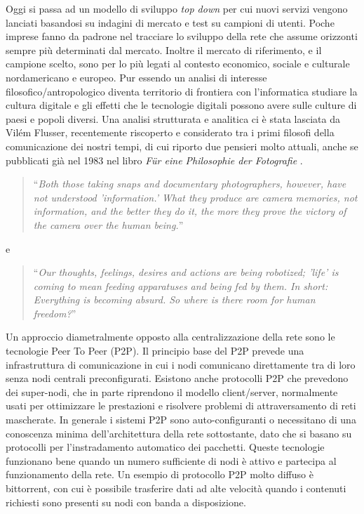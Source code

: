 Oggi si passa ad un modello di sviluppo \emph{top down} per cui nuovi
servizi vengono lanciati basandosi su indagini di mercato e test su
campioni di utenti. Poche imprese fanno da padrone nel tracciare lo
sviluppo della rete che assume orizzonti sempre più determinati dal
mercato. Inoltre il mercato di riferimento, e il campione scelto, sono
per lo più legati al contesto economico, sociale e culturale
nordamericano e europeo. Pur essendo un analisi di interesse
filosofico/antropologico diventa territorio di frontiera con
l'informatica studiare la cultura digitale e gli effetti che le
tecnologie digitali possono avere sulle culture di paesi e popoli
diversi. Una analisi strutturata e analitica ci è stata lasciata da
Vilém Flusser, recentemente riscoperto e considerato tra i primi
filosofi della comunicazione dei nostri tempi, di cui riporto due
pensieri molto attuali, anche se pubblicati già nel 1983 nel libro
\emph{F{\"u}r eine Philosophie der Fotografie}
\citep{flusser1983philosophie}.


\begin{quote}
  ``\emph{Both those taking snaps and documentary photographers,
    however, have not understood 'information.' What they produce are
    camera memories, not information, and the better they do it, the
    more they prove the victory of the camera over the human being.}''
\end{quote}

e 

\begin{quote}
  ``\emph{Our thoughts, feelings, desires and actions are being
    robotized; 'life' is coming to mean feeding apparatuses and being
    fed by them. In short: Everything is becoming absurd. So where is
    there room for human freedom?}''
\end{quote}


Un approccio diametralmente opposto alla centralizzazione della rete
sono le tecnologie Peer To Peer (P2P). Il principio base del P2P
prevede una infrastruttura di comunicazione in cui i nodi comunicano
direttamente tra di loro senza nodi centrali preconfigurati. Esistono
anche protocolli P2P che prevedono dei super-nodi, che in parte
riprendono il modello client/server, normalmente usati per ottimizzare
le prestazioni e risolvere problemi di attraversamento di reti
mascherate. In generale i sistemi P2P sono auto-configuranti o
necessitano di una conoscenza minima dell'architettura della rete
sottostante, dato che si basano su protocolli per l'instradamento
automatico dei pacchetti. Queste tecnologie funzionano bene quando un
numero sufficiente di nodi è attivo e partecipa al funzionamento della
rete. Un esempio di protocollo P2P molto diffuso è bittorrent, con cui
è possibile trasferire dati ad alte velocità quando i contenuti
richiesti sono presenti su nodi con banda a disposizione.

